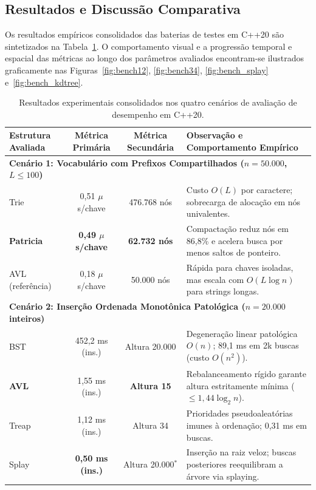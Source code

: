\documentclass[11pt,a4paper]{article}
\newcommand{\Ogrande}[1]{\ensuremath{O\!\left(#1\right)}}
\begin{document}
\subsection{Resultados e Discussão Comparativa}

Os resultados empíricos consolidados das baterias de testes em C++20 são sintetizados na Tabela~\ref{tab:benchmarks}. O comportamento visual e a progressão temporal e espacial das métricas ao longo dos parâmetros avaliados encontram-se ilustrados graficamente nas Figuras~\ref{fig:bench12}, \ref{fig:bench34}, \ref{fig:bench_splay} e~\ref{fig:bench_kdtree}.

\begin{table}[htbp]
\centering
\caption{Resultados experimentais consolidados nos quatro cenários de avaliação de desempenho em C++20.}
\label{tab:benchmarks}
\scriptsize
\setlength{\tabcolsep}{3.5pt}
\renewcommand{\arraystretch}{0.95}
\begin{tabularx}{\linewidth}{l c c >{\raggedright\arraybackslash}X}
\toprule
Estrutura Avaliada & Métrica Primária & Métrica Secundária & Observação e Comportamento Empírico \\
\midrule
\multicolumn{4}{l}{\textbf{Cenário 1: Vocabulário com Prefixos Compartilhados ($n=50.000$, $L \le 100$)}} \\
\midrule
Trie & 0,51 $\mu$s/chave & 476.768 nós & Custo $\Ogrande{L}$ por caractere; sobrecarga de alocação em nós univalentes. \\
\textbf{Patricia} & \textbf{0,49 $\mu$s/chave} & \textbf{62.732 nós} & Compactação reduz nós em 86,8\% e acelera busca por menos saltos de ponteiro. \\
AVL (referência) & 0,18 $\mu$s/chave & 50.000 nós & Rápida para chaves isoladas, mas escala com $\Ogrande{L \log n}$ para strings longas. \\
\midrule
\multicolumn{4}{l}{\textbf{Cenário 2: Inserção Ordenada Monotônica Patológica ($n=20.000$ inteiros)}} \\
\midrule
BST & 452,2 ms (ins.) & Altura 20.000 & Degeneração linear patológica $\Ogrande{n}$; 89,1 ms em 2k buscas (custo $\Ogrande{n^2}$). \\
\textbf{AVL} & 1,55 ms (ins.) & \textbf{Altura 15} & Rebalanceamento rígido garante altura estritamente mínima ($\le 1,44\log_2 n$). \\
Treap & 1,12 ms (ins.) & Altura 34 & Prioridades pseudoaleatórias imunes à ordenação; 0,31 ms em buscas. \\
Splay & \textbf{0,50 ms (ins.)} & Altura 20.000$^*$ & Inserção na raiz veloz; buscas posteriores reequilibram a árvore via splaying. \\

\end{tabularx}
\end{table}
\end{document}
